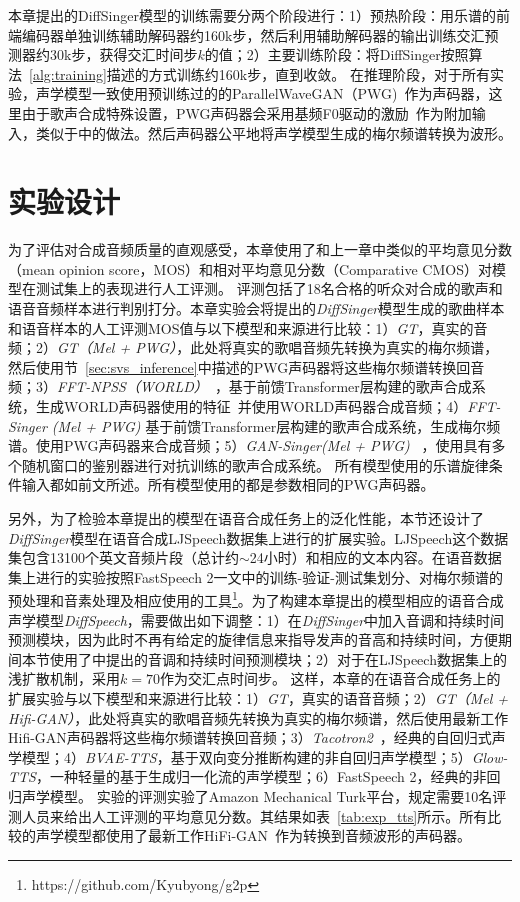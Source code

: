 本章提出的DiffSinger模型的训练需要分两个阶段进行：1）预热阶段：用乐谱的前端编码器单独训练辅助解码器约160k步，然后利用辅助解码器的输出训练交汇预测器约30k步，获得交汇时间步$k$的值；2）主要训练阶段：将DiffSinger按照算法~\ref{alg:training}描述的方式训练约160k步，直到收敛。
在推理阶段，对于所有实验，声学模型一致使用预训练过的的ParallelWaveGAN（PWG)~\citep{yamamoto2020parallel}作为声码器，这里由于歌声合成特殊设置，PWG声码器会采用基频F0驱动的激励~\citep{wang2020using}作为附加输入，类似于\citet{chen2020hifisinger}中的做法。然后声码器公平地将声学模型生成的梅尔频谱转换为波形。
\section{实验设计}
为了评估对合成音频质量的直观感受，本章使用了和上一章中类似的平均意见分数（mean opinion score，MOS）和相对平均意见分数（Comparative CMOS）对模型在测试集上的表现进行人工评测。 评测包括了18名合格的听众对合成的歌声和语音音频样本进行判别打分。本章实验会将提出的\textit{DiffSinger}模型生成的歌曲样本和语音样本的人工评测MOS值与以下模型和来源进行比较：1）\textit{GT}，真实的音频；2）\textit{GT（Mel + PWG）}，此处将真实的歌唱音频先转换为真实的梅尔频谱，然后使用节~\ref{sec:svs_inference}中描述的PWG声码器将这些梅尔频谱转换回音频；3）\textit{FFT-NPSS（WORLD）}~\citep{blaauw2020sequence}，基于前馈Transformer层构建的歌声合成系统，生成WORLD声码器使用的特征~\citep{morise2016world}并使用WORLD声码器合成音频；4）\textit{FFT-Singer (Mel + PWG)} 基于前馈Transformer层构建的歌声合成系统，生成梅尔频谱。使用PWG声码器来合成音频；5）\textit{GAN-Singer(Mel + PWG)}
~\citep{wu2020adversarially}，使用具有多个随机窗口的鉴别器进行对抗训练的歌声合成系统。
所有模型使用的乐谱旋律条件输入都如前文所述。所有模型使用的都是参数相同的PWG声码器。

另外，为了检验本章提出的模型在语音合成任务上的泛化性能，本节还设计了\textit{DiffSinger}模型在语音合成LJSpeech数据集\cite{ljspeech17}上进行的扩展实验。LJSpeech这个数据集包含13100个英文音频片段（总计约$\sim$24小时）和相应的文本内容。在语音数据集上进行的实验按照FastSpeech 2\citep{ren2021fastspeech}一文中的训练-验证-测试集划分、对梅尔频谱的预处理和音素处理及相应使用的工具\footnote{https://github.com/Kyubyong/g2p}。为了构建本章提出的模型相应的语音合成声学模型\textit{DiffSpeech}，需要做出如下调整：1）在\textit{DiffSinger}中加入音调和持续时间预测模块，因为此时不再有给定的旋律信息来指导发声的音高和持续时间，方便期间本节使用了中提出的音调和持续时间预测模块；2）对于在LJSpeech数据集上的浅扩散机制，采用$k=70$作为交汇点时间步。
这样，本章的在语音合成任务上的扩展实验与以下模型和来源进行比较：1）\textit{GT}，真实的语音音频；2）\textit{GT（Mel + Hifi-GAN）}，此处将真实的歌唱音频先转换为真实的梅尔频谱，然后使用最新工作Hifi-GAN声码器将这些梅尔频谱转换回音频；3）\textit{Tacotron2}~\citep{shen2018natural}，经典的自回归式声学模型；4）\textit{BVAE-TTS}\citep{lee2020bidirectional}，基于双向变分推断构建的非自回归声学模型；5）\textit{Glow-TTS}\citep{kim2020glow}，一种轻量的基于生成归一化流的声学模型；6）FastSpeech 2\citep{ren2021fastspeech}，经典的非回归声学模型。
实验的评测实验了Amazon Mechanical Turk平台，规定需要10名评测人员来给出人工评测的平均意见分数。其结果如表~\ref{tab:exp_tts}所示。所有比较的声学模型都使用了最新工作HiFi-GAN~\citep{kong2020hifi}作为转换到音频波形的声码器。
